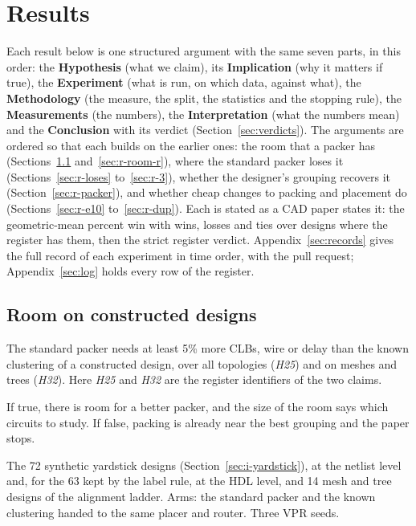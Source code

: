 \section{Results}
\label{sec:results}

Each result below is one structured argument with the same seven parts, in this order: the \textbf{Hypothesis} (what we claim), its \textbf{Implication} (why it matters if true), the \textbf{Experiment} (what is run, on which data, against what), the \textbf{Methodology} (the measure, the split, the statistics and the stopping rule), the \textbf{Measurements} (the numbers), the \textbf{Interpretation} (what the numbers mean) and the \textbf{Conclusion} with its verdict (Section~\ref{sec:verdicts}). The arguments are ordered so that each builds on the earlier ones: the room that a packer has (Sections~\ref{sec:r-room-s} and~\ref{sec:r-room-r}), where the standard packer loses it (Sections~\ref{sec:r-loses} to~\ref{sec:r-3}), whether the designer's grouping recovers it (Section~\ref{sec:r-packer}), and whether cheap changes to packing and placement do (Sections~\ref{sec:r-e10} to~\ref{sec:r-dup}). Each is stated as a CAD paper states it: the geometric-mean percent win with wins, losses and ties over designs where the register has them, then the strict register verdict. Appendix~\ref{sec:records} gives the full record of each experiment in time order, with the pull request; Appendix~\ref{sec:log} holds every row of the register.

\subsection{Room on constructed designs}
\label{sec:r-room-s}

 The standard packer needs at least 5\% more CLBs, wire or delay than the known clustering of a constructed design, over all topologies (\emph{H25}) and on meshes and trees (\emph{H32}). Here \emph{H25} and \emph{H32} are the register identifiers of the two claims.

 If true, there is room for a better packer, and the size of the room says which circuits to study. If false, packing is already near the best grouping and the paper stops.

 The 72 synthetic yardstick designs (Section~\ref{sec:i-yardstick}), at the netlist level and, for the 63 kept by the label rule, at the HDL level, and 14 mesh and tree designs of the alignment ladder. Arms: the standard packer and the known clustering handed to the same placer and router. Three VPR seeds.

